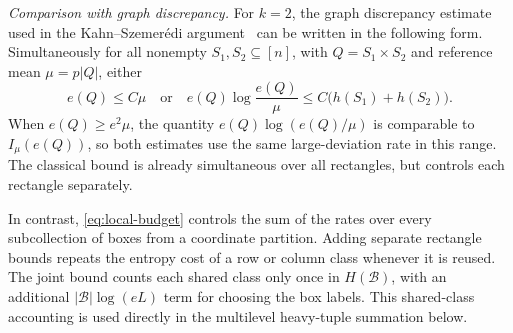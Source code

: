 \documentclass[10pt,a4paper]{amsart}
\numberwithin{equation}{section}
\begin{document}
\smallskip\noindent\emph{Comparison with graph discrepancy.}
For $k=2$, the graph discrepancy estimate used in the
Kahn--Szemer\'edi argument~\cite{FO05,LR15} can be written in the
following form. Simultaneously for all nonempty $S_1,S_2\subseteq[n]$,
with $Q=S_1\times S_2$ and reference mean $\mu=p|Q|$, either
\[
 e(Q)\le C\mu
 \quad\text{or}\quad
 e(Q)\log\frac{e(Q)}{\mu}
 \le C\bigl(h(S_1)+h(S_2)\bigr).
\]
When $e(Q)\ge e^2\mu$, the quantity $e(Q)\log(e(Q)/\mu)$ is comparable
to $I_\mu(e(Q))$, so both estimates use the same large-deviation rate
in this range. The classical bound is already simultaneous over all
rectangles, but controls each rectangle separately.

In contrast, \eqref{eq:local-budget} controls the sum of the rates over
every subcollection of boxes from a coordinate partition. Adding
separate rectangle bounds repeats the entropy cost of a row or column
class whenever it is reused. The joint bound counts each shared class
only once in $H(\mathcal B)$, with an additional
$|\mathcal B|\log(eL)$ term for choosing the box labels.
This shared-class accounting is used directly in the multilevel
heavy-tuple summation below.
\end{document}
